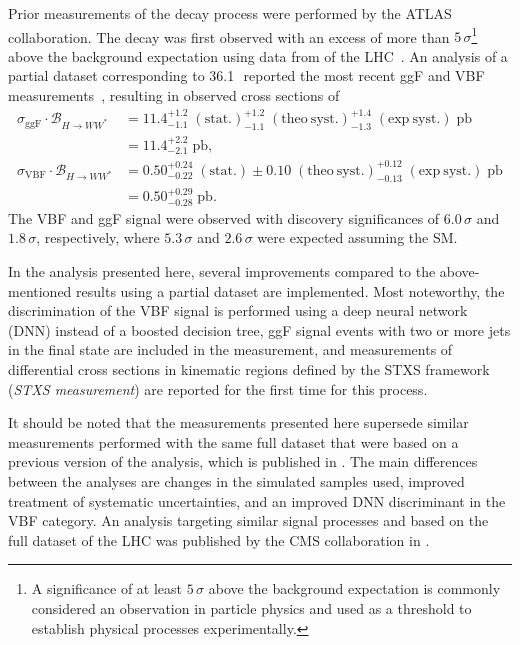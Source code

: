 Prior measurements of the \HWW decay process were performed by the ATLAS collaboration.
The \HWW decay was first observed with an excess of more than $5\,\sigma$\footnote{A significance of at least $5\,\sigma$ above the background expectation is commonly considered an observation in particle physics and used as a threshold to establish physical processes experimentally.} above the background expectation using data from \RunOne of the LHC~\cite{HIGG-2013-13}. An analysis of a partial \RunTwo dataset corresponding to 36.1\,\ifb\ reported the most recent ggF and VBF \HWW measurements~\cite{HIGG-2013-13}, resulting in observed cross sections of
\begin{align}
    \label{eq:xsec:prev-run2-results}
    \sigma_{\mathrm{ggF}} \cdot \mathcal{B}_{H \to WW^{\ast}} & = 11.4^{+1.2}_{-1.1}\;(\mathrm{stat.}) ^{+1.2}_{-1.1}\;(\mathrm{theo~ syst.}) ^{+1.4}_{-1.3}\;(\mathrm{exp~ syst.})\;\mathrm{pb}  \\
                                                              & = 11.4 ^{+2.2}_{-2.1}\;\mathrm{pb}, \\
    \sigma_{\mathrm{VBF}} \cdot \mathcal{B}_{H \to WW^{\ast}} & = 0.50 ^{+0.24}_{-0.22}\;(\mathrm{stat.}) \pm 0.10\;(\mathrm{theo~ syst.}) ^{+0.12}_{-0.13}\;(\mathrm{exp~ syst.})\;\mathrm{pb} \\
                                                              & = 0.50 ^{+0.29}_{-0.28}\;\mathrm{pb}.
\end{align}
The VBF and ggF signal were observed with discovery significances of $6.0\,\sigma$ and $1.8\,\sigma$, respectively, where $5.3\,\sigma$ and $2.6\,\sigma$ were expected assuming the SM.

In the analysis presented here, several improvements compared to the above-mentioned results using a partial \RunTwo dataset are implemented. Most noteworthy, the discrimination of the VBF signal is performed using a deep neural network (DNN) instead of a boosted decision tree, ggF signal events with two or more jets in the final state are included in the measurement, and measurements of differential cross sections in kinematic regions defined by the STXS framework (\emph{STXS measurement}) are reported for the first time for this process.

It should be noted that the measurements presented here supersede similar measurements performed with the same full \RunTwo dataset that were based on a previous version of the analysis, which is published in .
The main differences between the analyses are changes in the simulated samples used, improved treatment of systematic uncertainties, and an improved DNN discriminant in the VBF category.
An analysis targeting similar signal processes and based on the full \RunTwo dataset of the LHC was published by the CMS collaboration in .